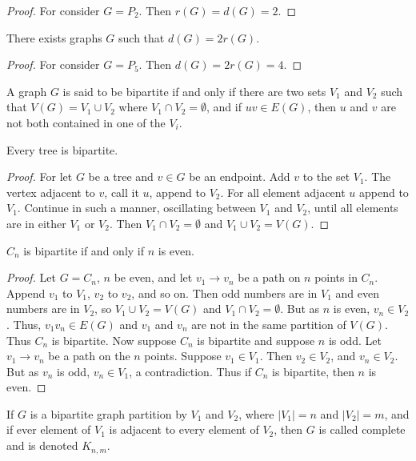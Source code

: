         \begin{proof}
        For consider $G=P_2$. Then $r(G) = d(G) = 2$.
        \end{proof}
        \begin{corollary}
        There exists graphs $G$ such that $d(G) = 2r(G)$.
        \end{corollary}
        \begin{proof}
        For consider $G=P_5$. Then $d(G) = 2r(G) = 4$.
        \end{proof}
        \begin{definition}
        A graph $G$ is said to be bipartite if and only if there are two sets $V_1$ and $V_2$ such that $V(G) = V_1\cup V_2$ where $V_1\cap V_2 = \emptyset$, and if $uv \in E(G)$, then $u$ and $v$ are not both contained in one of the $V_i$.
        \end{definition}
        \begin{theorem}
        Every tree is bipartite.
        \end{theorem}
        \begin{proof}
        For let $G$ be a tree and $v\in G$ be an endpoint. Add $v$ to the set $V_1$. The vertex adjacent to $v$, call it $u$, append to $V_2$. For all element adjacent $u$ append to $V_1$. Continue in such a manner, oscillating between $V_1$ and $V_2$, until all elements are in either $V_1$ or $V_2$. Then $V_1 \cap V_2 = \emptyset$ and $V_1 \cup V_2 = V(G)$.
        \end{proof}
        \begin{theorem}
        $C_n$ is bipartite if and only if $n$ is even. 
        \end{theorem}
        \begin{proof}
        Let $G=C_n$, $n$ be even, and let $v_1\rightarrow v_n$ be a path on $n$ points in $C_n$. Append $v_1$ to $V_1$, $v_2$ to $v_2$, and so on. Then odd numbers are in $V_1$ and even numbers are in $V_2$, so $V_1\cup V_2 = V(G)$ and $V_1 \cap V_2 = \emptyset$. But as $n$ is even, $v_n \in V_2$. Thus, $v_1 v_n \in E(G)$ and $v_1$ and $v_n$ are not in the same partition of $V(G)$. Thus $C_n$ is bipartite. Now suppose $C_n$ is bipartite and suppose $n$ is odd. Let $v_1 \rightarrow v_n$ be a path on the $n$ points. Suppose $v_1 \in V_1$. Then $v_2 \in V_2$, and $v_n \in V_2$. But as $v_n$ is odd, $v_{n} \in V_1$, a contradiction. Thus if $C_n$ is bipartite, then $n$ is even.
        \end{proof}
        \begin{definition}
        If $G$ is a bipartite graph partition by $V_1$ and $V_2$, where $|V_1| = n$ and $|V_2| = m$, and if ever element of $V_1$ is adjacent to every element of $V_2$, then $G$ is called complete and is denoted $K_{n,m}$.
        \end{definition}
